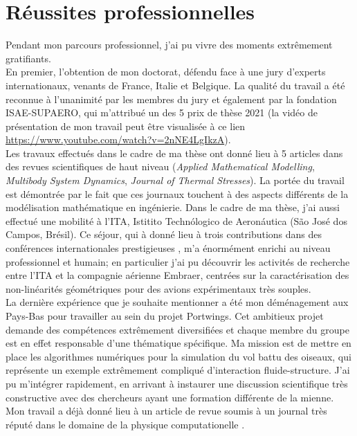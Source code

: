 \documentclass[12pt, french]{article}
\begin{document}
	
	\section{Réussites professionnelles}
	
	Pendant mon parcours professionnel, j'ai pu vivre des moments extrêmement gratifiants. \\
	
	En premier, l'obtention de mon doctorat, défendu face à une jury d'experts internationaux, venants de France, Italie et Belgique. La qualité du travail a été reconnue à l'unanimité par les membres du jury et également par la fondation ISAE-SUPAERO, qui m'attribué un des 5 prix de thèse 2021 (la vidéo de présentation de mon travail peut être visualisée à ce lien \url{https://www.youtube.com/watch?v=2nNE4LgIkzA}). \\
	
	Les travaux effectués dans le cadre de ma thèse ont donné lieu à 5 articles dans des revues scientifiques de haut niveau  (\textit{Applied Mathematical Modelling}, \textit{Multibody System Dynamics}, \textit{Journal of Thermal Stresses}). La portée du travail est démontrée par le fait que ces journaux touchent à des aspects différents de la modélisation mathématique en ingénierie. Dans le cadre de ma thèse, j'ai aussi effectué une  mobilité à l'ITA, Istitito Techn\'ologico de Aeron\'autica (São José dos Campos, Brésil). Ce séjour, qui à donné lieu à trois contributions dans des conférences internationales prestigieuses , m'a énormément enrichi au niveau professionnel et humain; en particulier j'ai pu découvrir les activités de recherche entre l'ITA et la compagnie aérienne Embraer, centrées sur la caractérisation des non-linéarités géométriques pour des avions expérimentaux très souples.  \\
	
	La dernière expérience que je souhaite mentionner a été mon déménagement aux Pays-Bas pour travailler au sein du projet Portwings. Cet ambitieux projet demande des compétences extrêmement diversifiées et chaque membre du groupe est en effet responsable d'une thématique spécifique. Ma mission est de mettre en place les algorithmes numériques pour la simulation du vol battu des oiseaux, qui représente un exemple extrêmement compliqué d'interaction fluide-structure. J'ai pu m'intégrer rapidement, en arrivant à instaurer une discussion scientifique très constructive avec des chercheurs ayant une formation différente de la mienne. Mon travail a déjà donné lieu à un article de revue soumis à un journal très réputé dans le domaine de la physique computationelle . 
	
\end{document}
